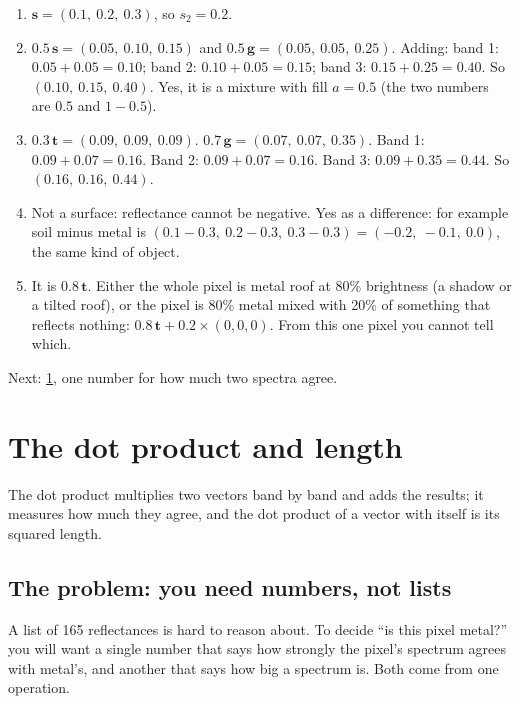 \documentclass[11pt,a4paper,oneside,openany]{book}
\newcommand{\B}[1]{{\symbf{#1}}}
\newcommand{\B}[1]{{\bm{#1}}}
\newcommand{\vt}{\B{t}}
\newcommand{\vg}{\B{g}}
\newcommand{\vs}{\B{s}}
\newcommand{\nextchapter}[1]{\par\medskip\noindent\hfill\textsf{\small Next: #1}\par}
\begin{document}
\begin{answers}
\begin{enumerate}
\item $\vs=(0.1,\ 0.2,\ 0.3)$, so $s_2=0.2$.
\item $0.5\,\vs=(0.05,\ 0.10,\ 0.15)$ and $0.5\,\vg=(0.05,\ 0.05,\ 0.25)$. Adding:
  band 1: $0.05+0.05=0.10$; band 2: $0.10+0.05=0.15$; band 3: $0.15+0.25=0.40$. So $(0.10,\ 0.15,\ 0.40)$. Yes, it is a
  mixture with fill $a=0.5$ (the two numbers are $0.5$ and $1-0.5$).
\item $0.3\,\vt=(0.09,\ 0.09,\ 0.09)$. $0.7\,\vg=(0.07,\ 0.07,\ 0.35)$. Band 1: $0.09+0.07=0.16$. Band 2: $0.09+0.07=0.16$.
  Band 3: $0.09+0.35=0.44$. So $(0.16,\ 0.16,\ 0.44)$.
\item Not a surface: reflectance cannot be negative. Yes as a difference: for example soil minus metal is
  $(0.1-0.3,\ 0.2-0.3,\ 0.3-0.3)=(-0.2,\ -0.1,\ 0.0)$, the same kind of object.
\item It is $0.8\,\vt$. Either the whole pixel is metal roof at 80\% brightness (a shadow or a tilted roof), or the pixel
  is 80\% metal mixed with 20\% of something that reflects nothing: $0.8\,\vt+0.2\times(0,0,0)$. From this one pixel you
  cannot tell which.
\end{enumerate}
\end{answers}

\nextchapter{\cref{ch:dot}, one number for how much two spectra agree.}

\chapter{The dot product and length}
\label{ch:dot}

\begin{onething}
The dot product multiplies two vectors band by band and adds the results; it measures how much they agree, and the dot
product of a vector with itself is its squared length.
\end{onething}

\section{The problem: you need numbers, not lists}

A list of 165 reflectances is hard to reason about. To decide ``is this pixel metal?'' you will want a single number that
says how strongly the pixel's spectrum agrees with metal's, and another that says how big a spectrum is. Both come from
one operation.
\end{document}

